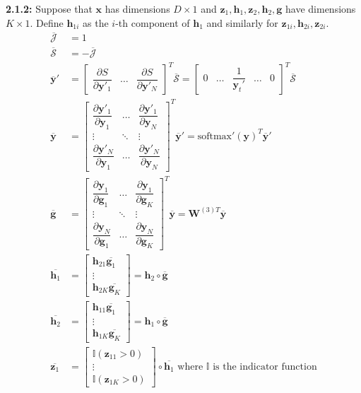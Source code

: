 \documentclass[12pt]{article}
\newcommand{\m}[1]{\mathbf{#1}}
\newcommand{\ol}[1]{\overline{#1}}
\begin{document}
\textbf{2.1.2:} Suppose that $\m x$ has dimensions $D \times 1$ and $\m z_1, \m h_1, \m z_2, \m h_2, \m g$ have dimensions $K \times 1$. Define $\m h_{1i}$ as the $i$-th component of $\m h_1$ and similarly for $\m z_{1i}, \m h_{2i}, \m z_{2i}$.
\begin{align*}
    \ol{\mathcal{J}} &= 1\\
    \ol{\mathcal{S}} &= -\ol{\mathcal{J}}\\
    \ol{\m y}' &= \begin{bmatrix} \dfrac{\partial S}{\partial\m y'_1} & \dots & \dfrac{\partial S}{\partial\m y'_N} \end{bmatrix}^T \ol{\mathcal{S}} = \begin{bmatrix} 0 & \dots & \dfrac{1}{\m y_t'} & \dots & 0 \end{bmatrix}^T \ol{\mathcal{S}}\\
    \ol{\m y} &= \begin{bmatrix} \dfrac{\partial\m y'_1}{\partial\m y_1} & \dots & \dfrac{\partial\m y'_1}{\partial\m y_N} \\ \vdots & \ddots & \vdots \\ \dfrac{\partial\m y'_N}{\partial\m y_1} & \dots & \dfrac{\partial\m y'_N}{\partial\m y_N} \end{bmatrix}^T \ol{\m y}' = \text{softmax}'(\m y)^T \ol{\m y}'\\
    \ol{\m g} &= \begin{bmatrix} \dfrac{\partial\m y_1}{\partial\m g_1} & \dots & \dfrac{\partial\m y_1}{\partial\m g_K} \\ \vdots & \ddots & \vdots \\ \dfrac{\partial\m y_N}{\partial\m g_1} & \dots & \dfrac{\partial\m y_N}{\partial\m g_K} \end{bmatrix}^T \ol{\m y} = \m W^{(3)T} \ol{\m y}\\
    \ol{\m h_1} &= \begin{bmatrix} \m h_{21}\ol{\m g_1} \\ \vdots \\ \m h_{2K}\ol{\m g_K} \end{bmatrix} = \m h_2 \circ \ol{\m g}\\
    \ol{\m h_2} &= \begin{bmatrix} \m h_{11}\ol{\m g_1} \\ \vdots \\ \m h_{1K}\ol{\m g_K} \end{bmatrix} = \m h_1 \circ \ol{\m g}\\
    \ol{\m z_1} &= \begin{bmatrix} \mathbb{I}(\m z_{11} > 0) \\ \vdots \\ \mathbb{I}(\m z_{1K} > 0) \end{bmatrix} \circ \ol{\m h_1} \text{ where }\mathbb{I}\text{ is the indicator function}\\

\end{align*}
\end{document}
